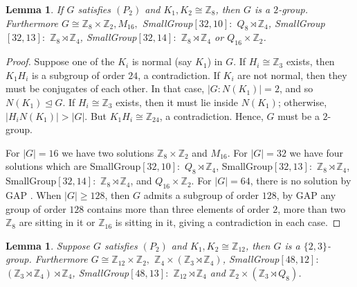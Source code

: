 \documentclass[a4paper,11pt]{amsart}
\numberwithin{equation}{section}
\numberwithin{equation}{subsection}
\newtheorem{lemma}[theorem]{Lemma}
\begin{document}
\begin{lemma}\label{lemma6}
   If $G$ satisfies $(P_2)$ and $K_{1}, K_{2} \cong \mathbb{Z}_{8}$, then $G$ is a $2$-group. Furthermore $G \cong \mathbb{Z}_8\times \mathbb{Z}_2, M_{16}, $ SmallGroup$[32,10]: $ $ Q_8 \rtimes \mathbb Z_4$, SmallGroup$[32,13]:$ $\mathbb Z_8 \rtimes \mathbb Z_4 $, SmallGroup$[32,14]:$ $\mathbb Z_8 \rtimes \mathbb Z_4$ or $Q_{16}\times \mathbb{Z}_2$.
\end{lemma}
\begin{proof}
  Suppose one of the $K_{i}$ is normal (say $K_1$) in $G$. If $H_i\cong \mathbb{Z}_3$ exists, then $K_1 H_i$ is a subgroup of order $24$,  a contradiction. If $K_{i}$ are not normal, then they must be conjugates of each other. In that case, $|G:N(K_1)| = 2$, and so $N(K_1)\trianglelefteq G$. If $H_i\cong \mathbb{Z}_3$ exists, then it must lie inside $N(K_1)$; otherwise, $|H_i N(K_1)|> |G|$. But $K_1H_{i}\cong \mathbb Z_{24}$,  a contradiction. Hence, $G$ must be a $2$- group. 

 For $|G| = 16$ we have two solutions $\mathbb{Z}_8\times \mathbb{Z}_2$ and $M_{16}$. For $|G| = 32$ we have four solutions which are SmallGroup$[32,10]:$ $ Q_8 \rtimes \mathbb Z_4$, SmallGroup$[32,13]:$ $\mathbb Z_8 \rtimes \mathbb Z_4 $, SmallGroup$[32,14]:$ $\mathbb Z_8 \rtimes \mathbb Z_4$, and $Q_{16}\times \mathbb{Z}_2$.  For $|G| = 64$,  there is no solution by GAP \cite{GAP}. When $|G|\geq 128$, then $G$ admits a subgroup of order $128$, by GAP \cite{GAP} any group of order $128$ contains more than three elements of order $2$, more than two $\mathbb{Z}_8$ are sitting in it or $\mathbb{Z}_{16}$ is sitting in it, giving a contradiction in each case.
\end{proof}
\begin{lemma}\label{lemma7}
Suppose $G$ satisfies $(P_2)$ and $K_{1}, K_{2} \cong \mathbb{Z}_{12}$, then $G$ is a $\{2,3\}$-group. Furthermore $G \cong \mathbb Z_{12}\times \mathbb Z_{2},$ $\mathbb Z_4\times (\mathbb{Z}_{3}\rtimes \mathbb{Z}_{4})$, SmallGroup$[48,12]:$ $(\mathbb{Z}_{3} \rtimes \mathbb{Z}_{4})\rtimes \mathbb{Z}_4$, SmallGroup$[48,13]:$ $\mathbb{Z}_{12}\rtimes \mathbb{Z}_4$ and $\mathbb{Z}_2\times (\mathbb{Z}_{3}\rtimes Q_{8})$.
\end{lemma}
\end{document}
